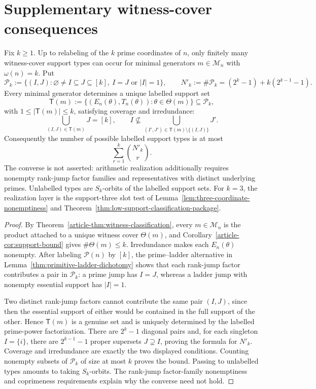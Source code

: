 \section{Supplementary witness-cover consequences}
\label{sec:supp-witness-consequences}

\begin{corollary}
\label{cor:finite-witness-cover-types}
Fix $k\ge1$. Up to relabeling of the $k$ prime coordinates of $n$, only
finitely many witness-cover support types can occur for minimal generators
$m\in\mathcal M_n$ with $\omega(n)=k$. Put
\[
\mathcal P_k:=\{(I,J):\varnothing\ne I\subseteq J\subseteq[k],\
 I=J\text{ or }|I|=1\},
\qquad
N'_k:=\#\mathcal P_k=(2^k-1)+k(2^{k-1}-1).
\]
Every minimal generator determines a unique labelled support set
\[
\mathsf T(m):=\{(E_n(\theta),T_n(\theta)):\theta\in\Theta(m)\}
 \subseteq\mathcal P_k,
\]
with $1\le|\mathsf T(m)|\le k$, satisfying coverage and irredundance:
\[
\bigcup_{(I,J)\in\mathsf T(m)}J=[k],\qquad
I\nsubseteq\bigcup_{(I',J')\in\mathsf T(m)\setminus\{(I,J)\}}J'.
\]
Consequently the number of possible labelled support types is at most
\[
\sum_{r=1}^k\binom{N'_k}{r}.
\]
The converse is not asserted: arithmetic realization additionally requires
nonempty rank-jump factor families and representatives with distinct underlying primes.
Unlabelled types are $S_k$-orbits of the labelled support sets. For $k=3$, the
realization layer is the support-three slot test of
Lemma~\ref{lem:three-coordinate-nonemptiness} and
Theorem~\ref{thm:low-support-classification-package}.
\end{corollary}

\begin{proof}
By Theorem~\ref{article-thm:witness-classification}, every $m\in\mathcal M_n$ is the
product attached to a unique witness cover $\Theta(m)$, and
Corollary~\ref{article-cor:support-bound} gives $\#\Theta(m)\le k$. Irredundance makes
each $E_n(\theta)$ nonempty. After labeling $\mathcal P(n)$ by $[k]$, the
prime--ladder alternative in Lemma~\ref{thm:primitive-ladder-dichotomy} shows
that each rank-jump factor contributes a pair in $\mathcal P_k$: a prime jump has $I=J$,
whereas a ladder jump with nonempty essential support has $|I|=1$.

Two distinct rank-jump factors cannot contribute the same pair $(I,J)$, since then the
essential support of either would be contained in the full support of the
other. Hence $\mathsf T(m)$ is a genuine set and is uniquely determined by
the labelled prime-power factorization. There are $2^k-1$ diagonal pairs and,
for each singleton $I=\{i\}$, there are $2^{k-1}-1$ proper supersets
$J\supsetneq I$, proving the formula for $N'_k$. Coverage and irredundance are
exactly the two displayed conditions. Counting nonempty subsets of
$\mathcal P_k$ of size at most $k$ proves the bound. Passing to unlabelled
types amounts to taking $S_k$-orbits. The rank-jump factor-family nonemptiness and
coprimeness requirements explain why the converse need not hold.
\end{proof}

